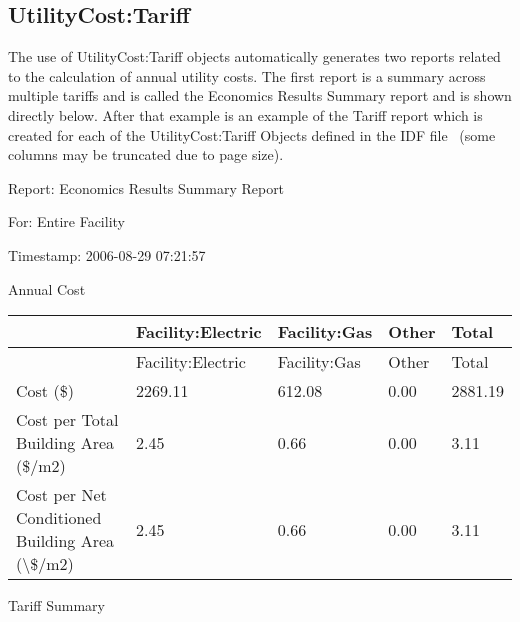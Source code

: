 \subsection{UtilityCost:Tariff}\label{utilitycosttariff}

The use of UtilityCost:Tariff objects automatically generates two reports related to the calculation of annual utility costs. The first report is a summary across multiple tariffs and is called the Economics Results Summary report and is shown directly below. After that example is an example of the Tariff report which is created for each of the UtilityCost:Tariff Objects defined in the IDF file~ (some columns may be truncated due to page size).

Report: Economics Results Summary Report

For: Entire Facility

Timestamp: 2006-08-29 07:21:57

Annual Cost

\begin{longtable}[c]{>{\raggedright}p{1.2in}>{\raggedright}p{1.2in}>{\raggedright}p{1.2in}>{\raggedright}p{1.2in}>{\raggedright}p{1.2in}}
\toprule 
~ & Facility:Electric & Facility:Gas & Other & Total \tabularnewline
\midrule
\endfirsthead

\toprule 
~ & Facility:Electric & Facility:Gas & Other & Total \tabularnewline
\midrule
\endhead

Cost (\$) & 2269.11 & 612.08 & 0.00 & 2881.19 \tabularnewline
Cost per Total Building Area (\$/m2) & 2.45 & 0.66 & 0.00 & 3.11 \tabularnewline
Cost per Net Conditioned Building Area (\textbackslash\$/m2) & 2.45 & 0.66 & 0.00 & 3.11 \tabularnewline
\bottomrule
\end{longtable}

Tariff Summary

